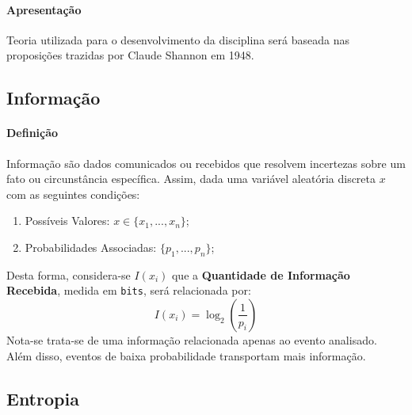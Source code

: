 \documentclass{article}
\begin{document}
        \paragraph{Apresentação}Teoria utilizada para o desenvolvimento da disciplina será baseada nas proposições trazidas por Claude Shannon em 1948.
\begin{multicols}{2}
    \raggedcolumns

    \subsection{Informação}
        \paragraph{Definição}Informação são dados comunicados ou recebidos que resolvem incertezas sobre um fato ou circunstância específica. Assim, dada uma variável aleatória discreta $x$ com as seguintes condições:
            \begin{enumerate}[noitemsep]
                \item Possíveis Valores: $x \in \{x_{1},...,x_{n}\}$;
                \item Probabilidades Associadas: $\{p_{1},...,p_{n}\}$;
            \end{enumerate}
        Desta forma, considera-se $I(x_{i})$ que a \textbf{Quantidade de Informação Recebida}, medida em \texttt{bits}, será relacionada por:
            \begin{equation}
                \boxed{
                    I(x_{i}) = \log_{2}\left(\frac{1}{p_{i}}\right)
                }
            \end{equation}
        Nota-se trata-se de uma informação relacionada apenas ao evento analisado. Além disso, eventos de baixa probabilidade transportam mais informação.

    \columnbreak

    \subsection{Entropia}

\end{multicols}
\end{document}
